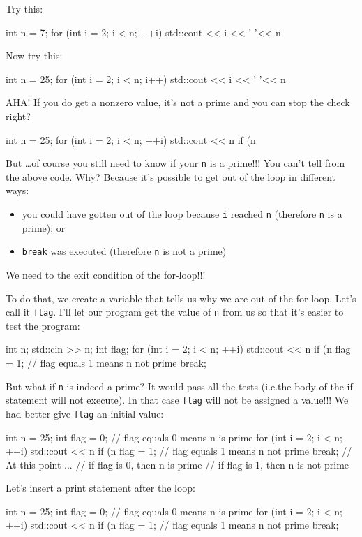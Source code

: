 \begin{console}
Try this:
\begin{console}
int n = 7;
for (int i = 2; i < n; ++i)
{   
    std::cout << i << ' '<< n %
}
\end{console}
Now try this:
\begin{console}
int n = 25;
for (int i = 2; i < n; i++)
{   
    std::cout << i << ' '<< n %
}
\end{console}
AHA! If you do get a nonzero value, it's not a prime and
you can stop the check right?
\begin{console}
int n = 25;
for (int i = 2; i < n; ++i)
{   
    std::cout << n %
    if (n %
}
\end{console}
But \ldots of course you still need to know if your \texttt{n} is a
prime!!! You can't tell from the above code. Why?
Because it's possible to get out of the loop in
 different ways:

\begin{itemize}
\item
  you could have gotten out of the loop because \texttt{i} reached
  \texttt{n} (therefore \texttt{n} is a prime); or
\item
  \texttt{break} was executed (therefore \texttt{n} is not a prime)
\end{itemize}

We need to  the exit condition of the for-loop!!!

To do that, we create a variable that tells us why we are out of the
for-loop. Let's call it \texttt{flag}.
I'll let our program get the value of \texttt{n} from us
so that it's easier to test the program:
\begin{console}
int n;
std::cin >> n;
int flag;
for (int i = 2; i < n; ++i)
{   
    std::cout << n %
    if (n %
    {
        flag = 1; // flag equals 1 means n not prime
        break;
    }
}
\end{console}

But what if \texttt{n} is indeed a prime? It would pass all the tests
(i.e.the body of the if statement will not execute). In that case
\texttt{flag} will not be assigned a value!!! We had better give
\texttt{flag} an initial value:
\begin{console}
int n = 25;
int flag = 0; // flag equals 0 means n is prime
for (int i = 2; i < n; ++i)
{   
    std::cout << n %
    if (n %
    {
        flag = 1; // flag equals 1 means n not prime
        break;
    }
}
// At this point ...
// if flag is 0, then n is prime
// if flag is 1, then n is not prime \\
\end{console}
Let's insert a print statement after the loop:
\begin{console}
int n = 25;
int flag = 0; // flag equals 0 means n is prime
for (int i = 2; i < n; ++i)
{   
    std::cout << n %
    if (n %
    {
        flag = 1; // flag equals 1 means n not prime
        break;
    }
}


\end{console}
\end{console}
